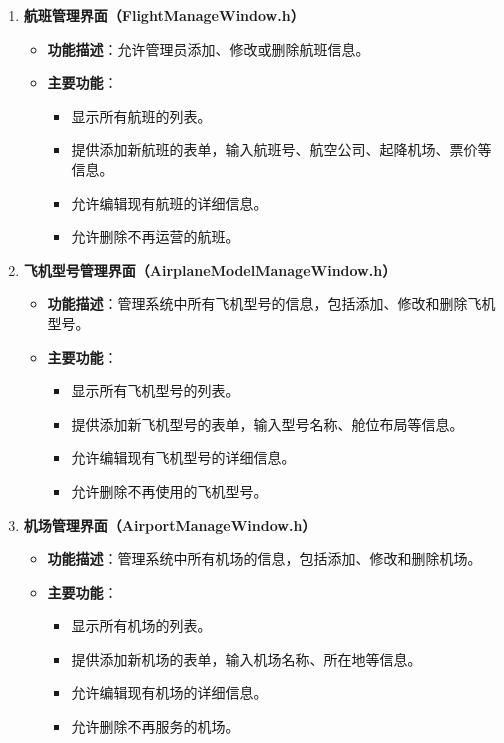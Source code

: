 \documentclass[UTF8, a4paper,12pt]{ctexart}
\begin{document}
\begin{enumerate}
    \item \textbf{航班管理界面（FlightManageWindow.h）}
    \begin{itemize}
        \item \textbf{功能描述}：允许管理员添加、修改或删除航班信息。
        \item \textbf{主要功能}：
        \begin{itemize}
            \item 显示所有航班的列表。
            \item 提供添加新航班的表单，输入航班号、航空公司、起降机场、票价等信息。
            \item 允许编辑现有航班的详细信息。
            \item 允许删除不再运营的航班。
        \end{itemize}
    \end{itemize}
    
    \item \textbf{飞机型号管理界面（AirplaneModelManageWindow.h）}
    \begin{itemize}
        \item \textbf{功能描述}：管理系统中所有飞机型号的信息，包括添加、修改和删除飞机型号。
        \item \textbf{主要功能}：
        \begin{itemize}
            \item 显示所有飞机型号的列表。
            \item 提供添加新飞机型号的表单，输入型号名称、舱位布局等信息。
            \item 允许编辑现有飞机型号的详细信息。
            \item 允许删除不再使用的飞机型号。
        \end{itemize}
    \end{itemize}
    
    \item \textbf{机场管理界面（AirportManageWindow.h）}
    \begin{itemize}
        \item \textbf{功能描述}：管理系统中所有机场的信息，包括添加、修改和删除机场。
        \item \textbf{主要功能}：
        \begin{itemize}
            \item 显示所有机场的列表。
            \item 提供添加新机场的表单，输入机场名称、所在地等信息。
            \item 允许编辑现有机场的详细信息。
            \item 允许删除不再服务的机场。
        \end{itemize}
    \end{itemize}
    

\end{enumerate}
\end{document}
